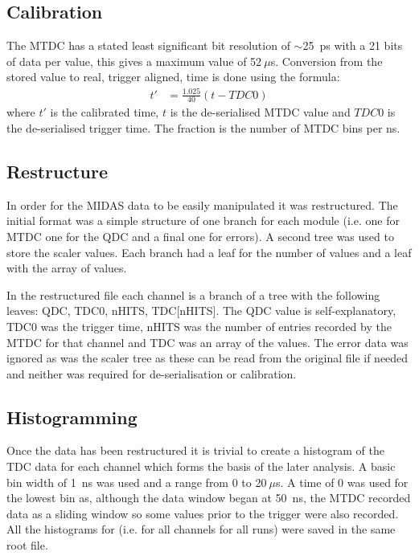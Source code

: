 \documentclass[]{article}
\newcommand{\ms}{$~\mu$s}
\begin{document}
\subsection{Calibration} %
\label{sub:calibration}
The MTDC has a stated least significant bit resolution of $\sim$25~ps with a 21 bits of data per value, this gives a maximum value of 52\ms{}. Conversion from the stored value to real, trigger aligned, time is done using the formula:
\begin{align}\label{equ:tdc_calibration}
    t'   &= \frac{1.025}{40}(t - TDC0)
\end{align}
where $t'$ is the calibrated time, $t$ is the de-serialised MTDC value and $TDC0$ is the de-serialised trigger time. The fraction is the number of MTDC bins per ns.
\subsection{Restructure} %
\label{sub:restructure}
In order for the MIDAS data to be easily manipulated it was restructured. The initial format was a simple structure of one branch for each module (i.e. one for MTDC one for the QDC and a final one for errors). A second tree was used to store the scaler values. Each branch had a leaf for the number of values and a leaf with the array of values.

In the restructured file each channel is a branch of a tree with the following leaves: QDC, TDC0, nHITS, TDC[nHITS]. The QDC value is self-explanatory, TDC0 was the trigger time, nHITS was the number of entries recorded by the MTDC for that channel and TDC was an array of the values. The error data was ignored as was the scaler tree as these can be read from the original file if needed and neither was required for de-serialisation or calibration.
\subsection{Histogramming} %
\label{sub:Histogramming}
Once the data has been restructured it is trivial to create a histogram of the TDC data for each channel which forms the basis of the later analysis. A basic bin width of 1~ns was used and a range from 0 to 20\ms. A time of 0 was used for the lowest bin as, although the data window began at 50~ns, the MTDC recorded data as a sliding window so some values prior to the trigger were also recorded. All the histograms for (i.e. for all channels for all runs) were saved in the same root file.
\end{document}
